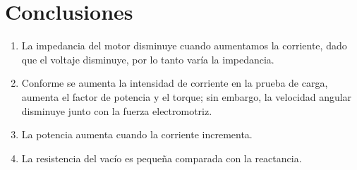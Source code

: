 \documentclass[a4paper,12pt]{article}
\begin{document}
\section{Conclusiones}
\begin{enumerate}
    \item La impedancia del motor disminuye cuando aumentamos la corriente, dado que el voltaje disminuye, por lo tanto varía la impedancia.
    \item Conforme se aumenta la intensidad de corriente en la prueba de carga, aumenta el factor de potencia y el torque; sin embargo, la velocidad angular disminuye junto con la fuerza electromotriz.
    \item La potencia aumenta cuando la corriente incrementa.
    \item La resistencia del vacío es pequeña comparada con la reactancia.
\end{enumerate}
\newpage
{}
\end{document}
